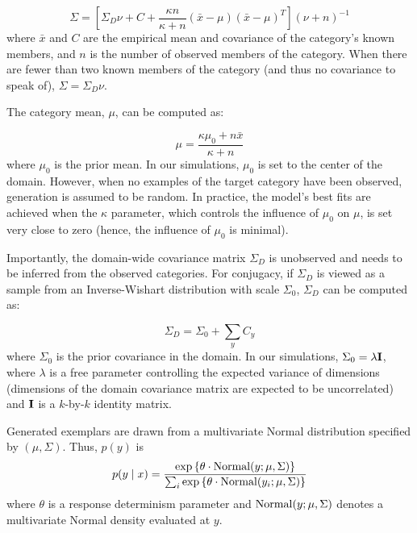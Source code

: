 \documentclass[12pt]{article}
\begin{document}
\begin{equation} \Sigma = \left[ \Sigma_D \nu + C + \dfrac {\kappa n} {\kappa +
n} (\bar{x}-\mu)(\bar{x}-\mu)^T \right] (\nu + n)^{-1}
\label{eq:Sigma_B}
\end{equation}
% 
where $\bar{x}$ and $C$ are the empirical mean and covariance of the category's
known members, and $n$ is the number of observed members of the category. When
there are fewer than two known members of the category (and thus no covariance
to speak of), $\Sigma = \Sigma_D\nu$.

The category mean, $\mu$, can be computed as:

\begin{equation} \mu = \dfrac {\kappa\mu_{0} + n \bar{x}} {\kappa + n}
    \label{eq:category_mus_jk13}
\end{equation}
% 
where $\mu_{0}$ is the prior mean. In our simulations, $\mu_{0}$ is set to the
center of the domain. However, when no examples of the target category have been
observed, generation is assumed to be random. In practice, the model's best fits
are achieved when the $\kappa$ parameter, which controls the influence of
$\mu_0$ on $\mu$, is set very close to zero (hence, the influence of $\mu_0$ is
minimal).

Importantly, the domain-wide covariance matrix $\Sigma_D$ is unobserved and
needs to be inferred from the observed categories. For conjugacy, if $\Sigma_D$
is viewed as a sample from an Inverse-Wishart distribution with scale
$\Sigma_0$, $\Sigma_D$ can be computed as:

 \begin{equation} \Sigma_D = \Sigma_0 + \sum_y{C_y}
    \label{eq:category_sigmas}
\end{equation}
% 
where $\Sigma_0$ is the prior covariance in the domain. In our simulations,
$\Sigma_0 = \lambda {\bf I}$, where $\lambda$ is a free parameter controlling
the expected variance of dimensions (dimensions of the domain covariance matrix
are expected to be uncorrelated) and ${\bf I}$ is a $k$-by-$k$ identity matrix.

Generated exemplars are drawn from a multivariate Normal distribution specified
by $(\mu, \Sigma)$. Thus, $p(y)$ is
\begin{equation} p(y \mid x) = \dfrac {\exp \left \{ \theta \cdot {\rm
Normal}(y; \mu, \Sigma) \right \} } {\sum_i \exp \left \{ \theta \cdot {\rm
Normal}(y_i; \mu, \Sigma) \right \} }
\end{equation}
% 
where $\theta$ is a response determinism parameter and ${\rm Normal}(y; \mu,
\Sigma)$ denotes a multivariate Normal density evaluated at $y$.
\end{document}
